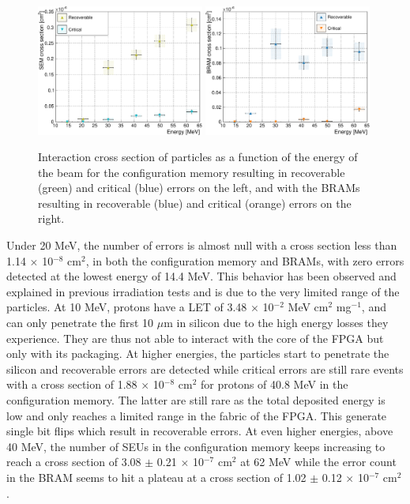       \begin{figure}[b!]
        \centering
        \includegraphics[width=0.49\textwidth]{img/plots/cE_SEM-crop}
        \includegraphics[width=0.49\textwidth]{img/plots/cE_BRAM-crop}
        \caption{Interaction cross section of particles as a function of the energy of the beam for the configuration memory resulting in recoverable (green) and critical (blue) errors on the left, and with the BRAMs resulting in recoverable (blue) and critical (orange) errors on the right.}
        \label{fig:II-5-data-seu-energy}
      \end{figure}

      Under 20 MeV, the number of errors is almost null with a cross section less than 1.14 $\times$ 10$^{-8}$ cm$^2$, in both the configuration memory and BRAMs, with zero errors detected at the lowest energy of 14.4 MeV. This behavior has been observed and explained in previous irradiation tests \cite{Bylsma2013242, Huhtinen2000155} and is due to the very limited range of the particles. At 10 MeV, protons have a LET of 3.48 $\times$ 10$^{-2}$ MeV cm$^2$ mg$^{-1}$, and can only penetrate the first 10 $\mu$m in silicon due to the high energy losses they experience. They are thus not able to interact with the core of the FPGA but only with its packaging. At higher energies, the particles start to penetrate the silicon and recoverable errors are detected while critical errors are still rare events with a cross section of 1.88 $ \times $ 10$^{-8}$ cm$^2$ for protons of 40.8 MeV in the configuration memory. The latter are still rare as the total deposited energy is low and only reaches a limited range in the fabric of the FPGA. This generate single bit flips which result in recoverable errors. At even higher energies, above 40 MeV, the number of SEUs in the configuration memory keeps increasing to reach a cross section of 3.08 $\pm$ 0.21 $ \times $ 10$^{-7}$ cm$^2$ at 62 MeV while the error count in the BRAM seems to hit a plateau at a cross section of 1.02 $\pm$ 0.12 $ \times $ 10$^{-7}$ cm$^2$. \\

